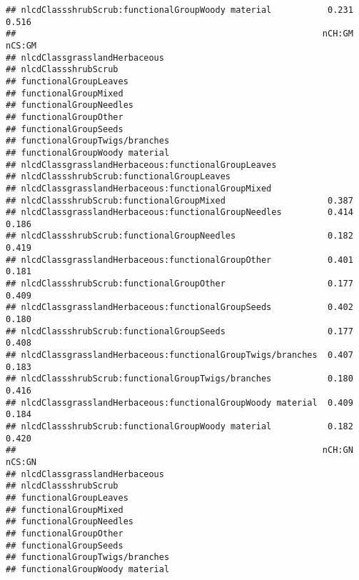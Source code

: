 \documentclass[]{article}
\begin{document}
\begin{verbatim}
## nlcdClassshrubScrub:functionalGroupWoody material           0.231  0.516
##                                                            nCH:GM nCS:GM
## nlcdClassgrasslandHerbaceous                                            
## nlcdClassshrubScrub                                                     
## functionalGroupLeaves                                                   
## functionalGroupMixed                                                    
## functionalGroupNeedles                                                  
## functionalGroupOther                                                    
## functionalGroupSeeds                                                    
## functionalGroupTwigs/branches                                           
## functionalGroupWoody material                                           
## nlcdClassgrasslandHerbaceous:functionalGroupLeaves                      
## nlcdClassshrubScrub:functionalGroupLeaves                               
## nlcdClassgrasslandHerbaceous:functionalGroupMixed                       
## nlcdClassshrubScrub:functionalGroupMixed                    0.387       
## nlcdClassgrasslandHerbaceous:functionalGroupNeedles         0.414  0.186
## nlcdClassshrubScrub:functionalGroupNeedles                  0.182  0.419
## nlcdClassgrasslandHerbaceous:functionalGroupOther           0.401  0.181
## nlcdClassshrubScrub:functionalGroupOther                    0.177  0.409
## nlcdClassgrasslandHerbaceous:functionalGroupSeeds           0.402  0.180
## nlcdClassshrubScrub:functionalGroupSeeds                    0.177  0.408
## nlcdClassgrasslandHerbaceous:functionalGroupTwigs/branches  0.407  0.183
## nlcdClassshrubScrub:functionalGroupTwigs/branches           0.180  0.416
## nlcdClassgrasslandHerbaceous:functionalGroupWoody material  0.409  0.184
## nlcdClassshrubScrub:functionalGroupWoody material           0.182  0.420
##                                                            nCH:GN nCS:GN
## nlcdClassgrasslandHerbaceous                                            
## nlcdClassshrubScrub                                                     
## functionalGroupLeaves                                                   
## functionalGroupMixed                                                    
## functionalGroupNeedles                                                  
## functionalGroupOther                                                    
## functionalGroupSeeds                                                    
## functionalGroupTwigs/branches                                           
## functionalGroupWoody material                                           

\end{verbatim}
\end{document}
